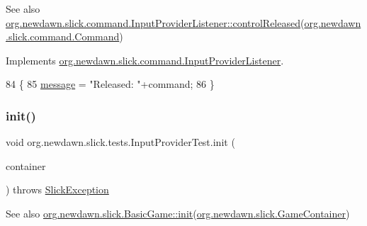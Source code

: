 \begin{DoxySeeAlso}{See also}
\mbox{\hyperlink{interfaceorg_1_1newdawn_1_1slick_1_1command_1_1_input_provider_listener_a28d87cd5fecc65f097e2034abe58bc7a}{org.\+newdawn.\+slick.\+command.\+Input\+Provider\+Listener\+::control\+Released}}(\mbox{\hyperlink{interfaceorg_1_1newdawn_1_1slick_1_1command_1_1_command}{org.\+newdawn.\+slick.\+command.\+Command}}) 
\end{DoxySeeAlso}


Implements \mbox{\hyperlink{interfaceorg_1_1newdawn_1_1slick_1_1command_1_1_input_provider_listener_a28d87cd5fecc65f097e2034abe58bc7a}{org.\+newdawn.\+slick.\+command.\+Input\+Provider\+Listener}}.


\begin{DoxyCode}
84                                                  \{
85         \mbox{\hyperlink{classorg_1_1newdawn_1_1slick_1_1tests_1_1_input_provider_test_a730fb6709b68daac2561204c3ab0e7fc}{message}} = \textcolor{stringliteral}{"Released: "}+command;
86     \}
\end{DoxyCode}
\mbox{\label{classorg_1_1newdawn_1_1slick_1_1tests_1_1_input_provider_test_a8ad5b9906f771a9d63e0a60df3993fcb}} 
\subsubsection{\texorpdfstring{init()}{init()}}
{\footnotesize\ttfamily void org.\+newdawn.\+slick.\+tests.\+Input\+Provider\+Test.\+init (\begin{DoxyParamCaption}\item[{\mbox{\hyperlink{classorg_1_1newdawn_1_1slick_1_1_game_container}{Game\+Container}}}]{container }\end{DoxyParamCaption}) throws \mbox{\hyperlink{classorg_1_1newdawn_1_1slick_1_1_slick_exception}{Slick\+Exception}}\hspace{0.3cm}{\ttfamily [inline]}}

\begin{DoxySeeAlso}{See also}
\mbox{\hyperlink{classorg_1_1newdawn_1_1slick_1_1_basic_game_a8af0900217e4d389249f71367b22d114}{org.\+newdawn.\+slick.\+Basic\+Game\+::init}}(\mbox{\hyperlink{classorg_1_1newdawn_1_1slick_1_1_game_container}{org.\+newdawn.\+slick.\+Game\+Container}}) 
\end{DoxySeeAlso}


